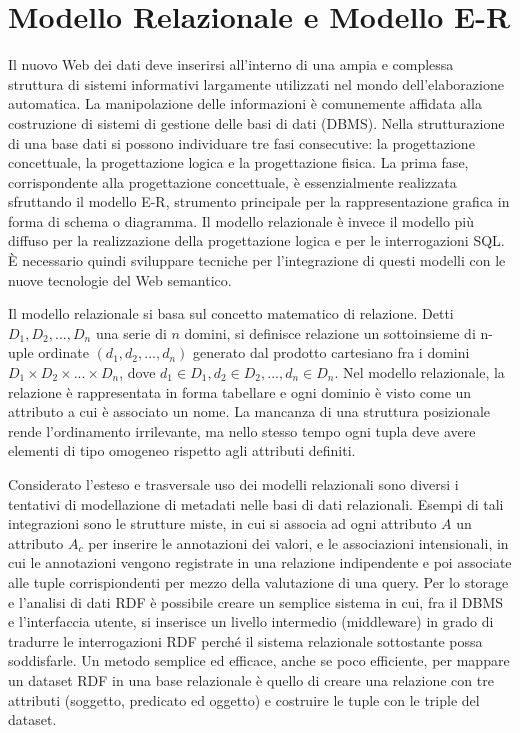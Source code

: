 \documentclass[Lau,binding=0.6cm,noexaminfo,oneside]{sapthesis}
\begin{document}
\section{Modello Relazionale e Modello E-R}

Il nuovo Web dei dati deve inserirsi all'interno di una ampia e complessa struttura di sistemi informativi largamente utilizzati nel mondo dell'elaborazione automatica. La manipolazione delle informazioni è comunemente affidata alla costruzione di sistemi di gestione delle basi di dati (DBMS). Nella strutturazione di una base dati si possono individuare tre fasi consecutive: la progettazione concettuale, la progettazione logica e la progettazione fisica.
La prima fase, corrispondente alla progettazione concettuale, è essenzialmente realizzata sfruttando il modello E-R, strumento principale per la rappresentazione grafica in forma di schema o diagramma. Il modello relazionale è invece il modello più diffuso per la realizzazione della progettazione logica e per le interrogazioni SQL. \MakeUppercase{è} necessario quindi sviluppare tecniche per l'integrazione di questi modelli con le nuove tecnologie del Web semantico.\medskip

Il modello relazionale si basa sul concetto matematico di relazione. Detti $D_1, D_2, ..., D_n$ una serie di $n$ domini, si definisce relazione un sottoinsieme di n-uple ordinate $(d_1, d_2, ..., d_n)$ generato dal prodotto cartesiano fra i domini $D_1 \times D_2 \times ... \times D_n$, dove $d_1 \! \in \! D_1, d_2 \! \in \! D_2, ..., d_n \! \in \! D_n$.
Nel modello relazionale, la relazione è rappresentata in forma tabellare e ogni dominio è visto come un attributo a cui è associato un nome. La mancanza di una struttura posizionale rende l'ordinamento irrilevante, ma nello stesso tempo ogni tupla deve avere elementi di tipo omogeneo rispetto agli attributi definiti.\medskip

Considerato l'esteso e trasversale uso dei modelli relazionali sono diversi i tentativi di modellazione di metadati nelle basi di dati relazionali. Esempi di tali integrazioni sono le strutture miste, in cui si associa ad ogni attributo $A$ un attributo $A_c$ per inserire le annotazioni dei valori, e le associazioni intensionali, in cui le annotazioni vengono registrate in una relazione indipendente e poi associate alle tuple corrispiondenti per mezzo della valutazione di una query.
Per lo storage e l'analisi di dati RDF è possibile creare un semplice sistema in cui, fra il DBMS e l'interfaccia utente, si inserisce un livello intermedio (middleware) in grado di tradurre le interrogazioni RDF perché il sistema relazionale sottostante possa soddisfarle. Un metodo semplice ed efficace, anche se poco efficiente, per mappare un dataset RDF in una base relazionale è quello di creare una relazione con tre attributi (soggetto, predicato ed oggetto) e costruire le tuple con le triple del dataset.\medskip
\end{document}

